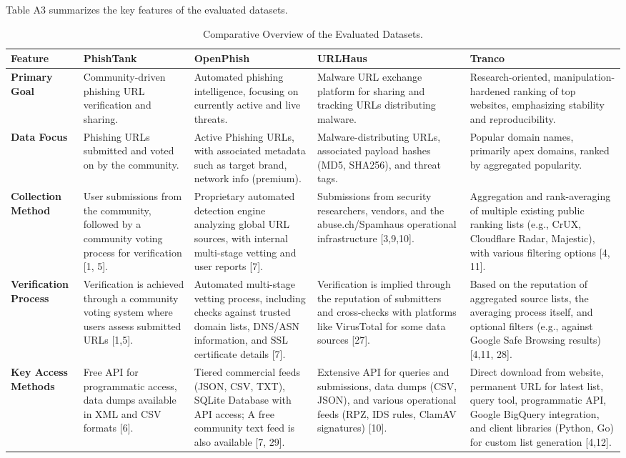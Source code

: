 \documentclass[journal,article,submit,pdftex,moreauthors]{Definitions/mdpi}
\begin{document}
Table A3 summarizes the key features of the evaluated datasets.

\begin{table}[H]
\caption{Comparative Overview of the Evaluated Datasets.\label{tab:A3}}
\small
\begin{tabularx}{\textwidth}{lXXXX}
\toprule
\textbf{Feature} & \textbf{PhishTank} & \textbf{OpenPhish} & \textbf{URLHaus} & \textbf{Tranco}\\
\midrule
\textbf{Primary Goal} & Community-driven phishing URL verification and sharing. & Automated phishing intelligence, focusing on currently active and live threats. & Malware URL exchange platform for sharing and tracking URLs distributing malware. & Research-oriented, manipulation-hardened ranking of top websites, emphasizing stability and reproducibility.\\
\textbf{Data Focus} & Phishing URLs submitted and voted on by the community. & Active Phishing URLs, with associated metadata such as target brand, network info (premium). & Malware-distributing URLs, associated payload hashes (MD5, SHA256), and threat tags. & Popular domain names, primarily apex domains, ranked by aggregated popularity.\\
\textbf{Collection Method} & User submissions from the community, followed by a community voting process for verification [1, 5]. & Proprietary automated detection engine analyzing global URL sources, with internal multi-stage vetting and user reports [7]. & Submissions from security researchers, vendors, and the abuse.ch/Spamhaus operational infrastructure [3,9,10]. & Aggregation and rank-averaging of multiple existing public ranking lists (e.g., CrUX, Cloudflare Radar, Majestic), with various filtering options [4, 11].\\
\textbf{Verification Process} & Verification is achieved through a community voting system where users assess submitted URLs [1,5]. & Automated multi-stage vetting process, including checks against trusted domain lists, DNS/ASN information, and SSL certificate details [7]. & Verification is implied through the reputation of submitters and cross-checks with platforms like VirusTotal for some data sources [27]. & Based on the reputation of aggregated source lists, the averaging process itself, and optional filters (e.g., against Google Safe Browsing results) [4,11, 28].\\
\textbf{Key Access Methods} & Free API for programmatic access, data dumps available in XML and CSV formats [6]. & Tiered commercial feeds (JSON, CSV, TXT), SQLite Database with API access; A free community text feed is also available [7, 29]. & Extensive API for queries and submissions, data dumps (CSV, JSON), and various operational feeds (RPZ, IDS rules, ClamAV signatures) [10]. & Direct download from website, permanent URL for latest list, query tool, programmatic API, Google BigQuery integration, and client libraries (Python, Go) for custom list generation [4,12].\\

\end{tabularx}
\end{table}
\end{document}

